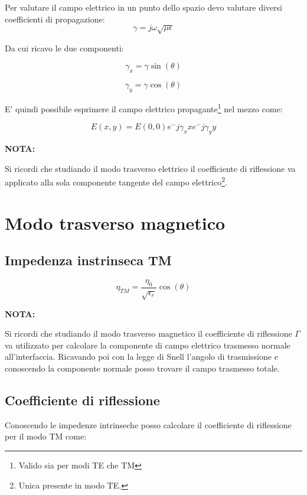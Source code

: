 \documentclass[10pt,a4paper]{report}
\begin{document}
			Per valutare il campo elettrico in un punto dello spazio devo valutare diversi coefficienti di propagazione:
			\begin{equation}
			\gamma=j\omega\sqrt{\mu\epsilon}\end{equation}

			Da cui ricavo le due componenti:

			\begin{equation}
			\gamma_x=\gamma\sin(\theta)
			\end{equation}

			\begin{equation}
			\gamma_y=\gamma\cos(\theta)
			\end{equation}

			E' quindi possibile esprimere il campo elettrico propagante\footnote{Valido sia per modi TE che TM} nel mezzo come:
			
			\begin{equation}
			E(x,y)=E(0,0)e^-{j\gamma_x x}e^-{j\gamma_y y}
			\end{equation}
		
			\textbf{NOTA:}

			Si ricordi che studiando il modo trasverso elettrico il coefficiente di riflessione va applicato alla sola componente tangente del campo elettrico\footnote{Unica presente in modo TE.}.
			
	\section{Modo trasverso magnetico}

			\subsection{Impedenza instrinseca TM}

				\begin{equation}
					\eta_{TM}=\frac{\eta_0}{\sqrt{\epsilon_r}}\cos(\theta)
				\end{equation}

			\textbf{NOTA:}

			Si ricordi che studiando il modo trasverso magnetico il coefficiente di riflessione $\Gamma$ va utilizzato per calcolare la componente di campo elettrico trasmesso normale all'interfaccia.
			Ricavando poi con la legge di Snell l'angolo di trasmissione e conoscendo la componente normale posso trovare il campo trasmesso totale.

		\subsection{Coefficiente di riflessione}
			Conoscendo le impedenze intrinseche posso calcolare il coefficiente di riflessione per il modo TM come:
\end{document}

